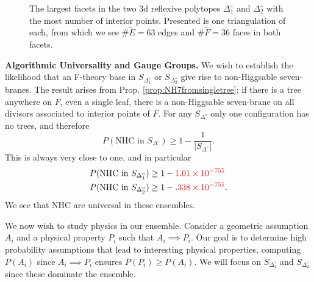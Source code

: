 \documentclass[aps,prl,twocolumn, superscriptaddress,groupedaddress,nofootinbib]{revtex4-1}
\newcommand{\sdoc}{S_{\Delta_1^\circ}}
\newcommand{\sdtc}{S_{\Delta_2^\circ}}
\begin{document}
\begin{figure}[t]
\caption{The largest facets in the two 3d reflexive polytopes $\Delta_1^\circ$ and $\Delta_2^\circ$
with the most number of interior points. Presented is one triangulation of each,
from which we see $\#\tilde E=63$ edges and $\#\tilde F=36$ faces in both facets.}
\label{fig:bigfacetbigone1}
\end{figure}

\vspace{.2cm}
\noindent \textbf{Algorithmic Universality and Gauge Groups.} We wish to establish
the likelihood that an F-theory base in $\sdoc$ or $\sdtc$ give rise to
non-Higgsable seven-branes. The result arises from Prop. \ref{prop:NH7fromsingletree}:
if there is a tree anywhere on $F$, even a single leaf, there is a
non-Higgsable seven-brane on all divisors associated to interior points of $F$.
For any $S_{\Delta^\circ}$ only one configuration has no trees, and therefore
\begin{equation}
P(\text{NHC in } S_{\Delta^\circ}) \geq 1 - \frac{1}{|S_{\Delta^\circ}|}.
\end{equation}
This is always very close to one, and in particular
\begin{align}
P(\text{NHC in } \sdoc) &\geq1-{\color{red}1.01\times 10^{-755}} \nonumber \\
P(\text{NHC in } \sdtc) &\geq 1-{\color{red}.338\times 10^{-755}}.
\end{align}
We see that NHC are universal in these ensembles.

We now wish to study physics in
our ensemble. Consider a geometric assumption $A_i$
and a physical property $P_i$ such that $A_i\implies P_i$. Our goal is to determine high
probability assumptions that lead to interesting physical properties, computing $P(A_i)$
since $A_i\implies P_i$ ensures $P(P_i)\geq P(A_i).$ We will focus on $\sdoc$ and $\sdtc$ since
these dominate the ensemble.
\end{document}
